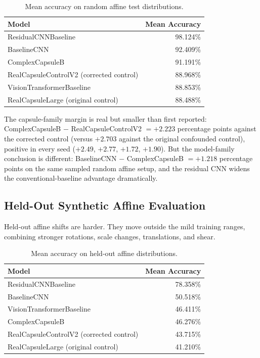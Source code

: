 \documentclass[11pt]{article}
\begin{document}
\begin{table}[t]
\centering
\small
\begin{tabular}{lr}
\toprule
Model & Mean Accuracy \\
\midrule
ResidualCNNBaseline & 98.124\% \\
BaselineCNN & 92.409\% \\
ComplexCapsuleB & 91.191\% \\
RealCapsuleControlV2 (corrected control) & 88.968\% \\
VisionTransformerBaseline & 88.853\% \\
RealCapsuleLarge (original control) & 88.488\% \\
\bottomrule
\end{tabular}
\caption{Mean accuracy on random affine test distributions.}
\label{tab:randomaffine}
\end{table}

The capsule-family margin is real but smaller than first reported: ComplexCapsuleB $-$ RealCapsuleControlV2 $= +2.223$ percentage points against the corrected control (versus $+2.703$ against the original confounded control), positive in every seed ($+2.49$, $+2.77$, $+1.72$, $+1.90$). But the model-family conclusion is different: BaselineCNN $-$ ComplexCapsuleB $= +1.218$ percentage points on the same sampled random affine setup, and the residual CNN widens the conventional-baseline advantage dramatically.

\subsection{Held-Out Synthetic Affine Evaluation}
Held-out affine shifts are harder. They move outside the mild training ranges, combining stronger rotations, scale changes, translations, and shear.

\begin{table}[t]
\centering
\small
\begin{tabular}{lr}
\toprule
Model & Mean Accuracy \\
\midrule
ResidualCNNBaseline & 78.358\% \\
BaselineCNN & 50.518\% \\
VisionTransformerBaseline & 46.411\% \\
ComplexCapsuleB & 46.276\% \\
RealCapsuleControlV2 (corrected control) & 43.715\% \\
RealCapsuleLarge (original control) & 41.210\% \\
\bottomrule
\end{tabular}
\caption{Mean accuracy on held-out affine distributions.}
\label{tab:heldout}
\end{table}
\end{document}
